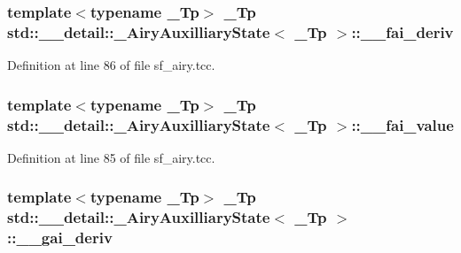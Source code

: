 \subsubsection[{\texorpdfstring{\+\_\+\+\_\+fai\+\_\+deriv}{__fai_deriv}}]{\setlength{\rightskip}{0pt plus 5cm}template$<$typename \+\_\+\+Tp$>$ \+\_\+\+Tp {\bf std\+::\+\_\+\+\_\+detail\+::\+\_\+\+Airy\+Auxilliary\+State}$<$ \+\_\+\+Tp $>$\+::\+\_\+\+\_\+fai\+\_\+deriv}\hypertarget{structstd_1_1____detail_1_1__AiryAuxilliaryState_acff728bf75b30e81549a554ef4c149c1}{}\label{structstd_1_1____detail_1_1__AiryAuxilliaryState_acff728bf75b30e81549a554ef4c149c1}


Definition at line 86 of file sf\+\_\+airy.\+tcc.

\subsubsection[{\texorpdfstring{\+\_\+\+\_\+fai\+\_\+value}{__fai_value}}]{\setlength{\rightskip}{0pt plus 5cm}template$<$typename \+\_\+\+Tp$>$ \+\_\+\+Tp {\bf std\+::\+\_\+\+\_\+detail\+::\+\_\+\+Airy\+Auxilliary\+State}$<$ \+\_\+\+Tp $>$\+::\+\_\+\+\_\+fai\+\_\+value}\hypertarget{structstd_1_1____detail_1_1__AiryAuxilliaryState_a71f1d48076c4a91aa4420c0ba3795c42}{}\label{structstd_1_1____detail_1_1__AiryAuxilliaryState_a71f1d48076c4a91aa4420c0ba3795c42}


Definition at line 85 of file sf\+\_\+airy.\+tcc.

\subsubsection[{\texorpdfstring{\+\_\+\+\_\+gai\+\_\+deriv}{__gai_deriv}}]{\setlength{\rightskip}{0pt plus 5cm}template$<$typename \+\_\+\+Tp$>$ \+\_\+\+Tp {\bf std\+::\+\_\+\+\_\+detail\+::\+\_\+\+Airy\+Auxilliary\+State}$<$ \+\_\+\+Tp $>$\+::\+\_\+\+\_\+gai\+\_\+deriv}\hypertarget{structstd_1_1____detail_1_1__AiryAuxilliaryState_a8b653323b9665a4f1768017d3a0e9051}{}\label{structstd_1_1____detail_1_1__AiryAuxilliaryState_a8b653323b9665a4f1768017d3a0e9051}



